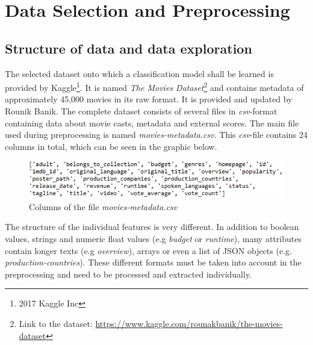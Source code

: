\chapter{Data Selection and Preprocessing}
\label{cha:data_selection}

\section{Structure of data and data exploration}
\label{sec:data_exploration}
The selected dataset onto which a classification model shall be learned is provided by Kaggle\footnote{2017 Kaggle Inc}. It is named \textit{The Movies Dataset}\footnote{Link to the dataset: \hyperref[https://www.kaggle.com/rounakbanik/the-movies-dataset]{https://www.kaggle.com/rounakbanik/the-movies-dataset}} and contains metadata of approximately 45,000 movies in its raw format. It is provided and updated by Rounik Banik. The complete dataset consists of several files in \textit{csv}-format containing data about movie casts, metadata and external scores. The main file used during preprocessing is named \textit{movies-metadata.csv}. This \textit{csv}-file contains 24 columns in total, which can be seen in the graphic below.
\begin{figure}[ht]
	\centering
		\includegraphics[width=\textwidth]{images/Raw_dataset_headers.png}
	\caption{Columns of the file \textit{movies-metadata.csv}}
\end{figure}


The structure of the individual features is very different. In addition to boolean values, strings and numeric float values (e.g \textit{budget} or \textit{runtime}), many attributes contain longer texts (e.g \textit{overview}), arrays or even a list of JSON objects (e.g. \textit{production-countries}). These different formats must be taken into account in the preprocessing and need to be processed and extracted individually.

